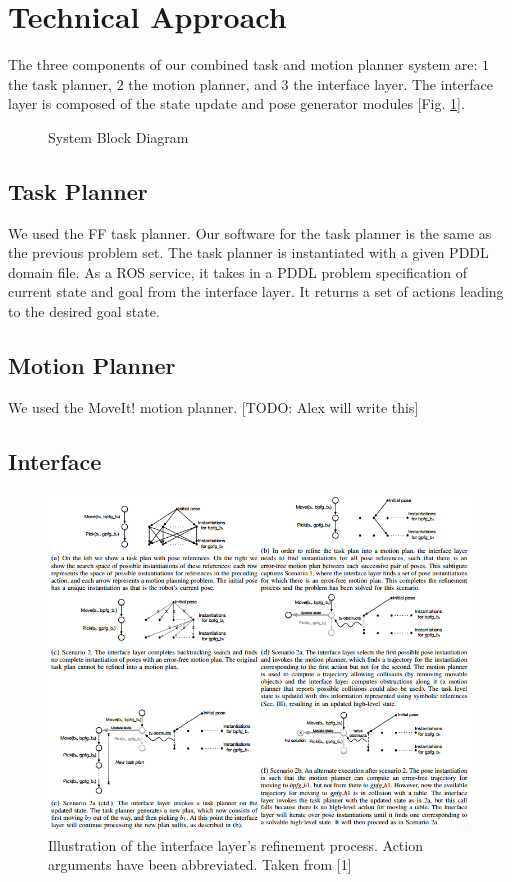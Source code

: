 \documentclass[12pt]{article}
\begin{document}
\section{Technical Approach}
The three components of our combined task and motion planner system are:  \(1\) the task planner, \(2\) the motion planner, and \(3\) the interface layer. 
The interface layer is composed of the state update and pose generator modules [Fig. \ref{fig:blockDiagram}].

\begin{figure}[h]
\centering
\def\svgwidth{0.5\textwidth}

\caption{System Block Diagram\label{fig:blockDiagram}}
\end{figure}

\subsection{Task Planner}
We used the FF task planner. 
Our software for the task planner is the same as the previous problem set. 
The task planner is instantiated with a given PDDL domain file.  
As a ROS service, it takes in a PDDL problem specification of current state and goal from the interface layer. 
It returns a set of actions leading to the desired goal state. 

\subsection{Motion Planner}
We used the MoveIt! motion planner. 
[TODO: Alex will write this]

\subsection{Interface}

\begin{figure}[t]
\centering
\includegraphics[width=\textwidth]{figures/figure4.png}
\caption{Illustration of the interface layer’s refinement process. 
Action arguments have been abbreviated. 
Taken from [1]
\label{fig:figure4}}
\end{figure}
\end{document}

